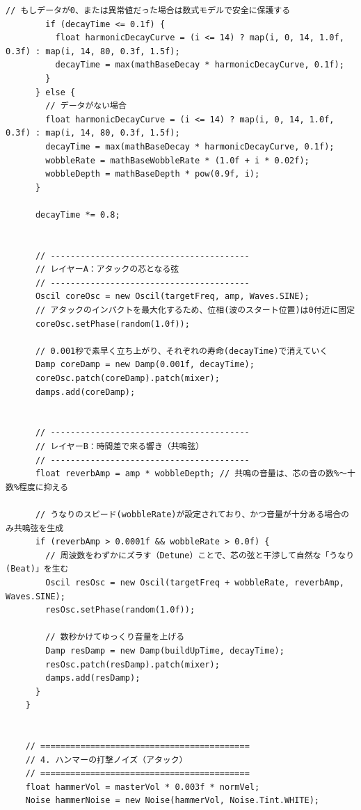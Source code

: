 \begin{lstlisting}[caption={Piano.pde}, label={lst:proc_piano}]
        // もしデータが0、または異常値だった場合は数式モデルで安全に保護する
        if (decayTime <= 0.1f) {
          float harmonicDecayCurve = (i <= 14) ? map(i, 0, 14, 1.0f, 0.3f) : map(i, 14, 80, 0.3f, 1.5f);
          decayTime = max(mathBaseDecay * harmonicDecayCurve, 0.1f);
        }
      } else {
        // データがない場合
        float harmonicDecayCurve = (i <= 14) ? map(i, 0, 14, 1.0f, 0.3f) : map(i, 14, 80, 0.3f, 1.5f);
        decayTime = max(mathBaseDecay * harmonicDecayCurve, 0.1f);
        wobbleRate = mathBaseWobbleRate * (1.0f + i * 0.02f); 
        wobbleDepth = mathBaseDepth * pow(0.9f, i);
      }
      
      decayTime *= 0.8;
      
      
      // ----------------------------------------
      // レイヤーA：アタックの芯となる弦
      // ----------------------------------------
      Oscil coreOsc = new Oscil(targetFreq, amp, Waves.SINE);
      // アタックのインパクトを最大化するため、位相(波のスタート位置)は0付近に固定
      coreOsc.setPhase(random(1.0f)); 
      
      // 0.001秒で素早く立ち上がり、それぞれの寿命(decayTime)で消えていく
      Damp coreDamp = new Damp(0.001f, decayTime);
      coreOsc.patch(coreDamp).patch(mixer);
      damps.add(coreDamp);
      
      
      // ----------------------------------------
      // レイヤーB：時間差で来る響き（共鳴弦）
      // ----------------------------------------
      float reverbAmp = amp * wobbleDepth; // 共鳴の音量は、芯の音の数%〜十数%程度に抑える
      
      // うなりのスピード(wobbleRate)が設定されており、かつ音量が十分ある場合のみ共鳴弦を生成
      if (reverbAmp > 0.0001f && wobbleRate > 0.0f) {
        // 周波数をわずかにズラす（Detune）ことで、芯の弦と干渉して自然な「うなり(Beat)」を生む
        Oscil resOsc = new Oscil(targetFreq + wobbleRate, reverbAmp, Waves.SINE);
        resOsc.setPhase(random(1.0f));
        
        // 数秒かけてゆっくり音量を上げる
        Damp resDamp = new Damp(buildUpTime, decayTime);
        resOsc.patch(resDamp).patch(mixer);
        damps.add(resDamp);
      }
    }
    
    
    // ==========================================
    // 4. ハンマーの打撃ノイズ（アタック）
    // ==========================================
    float hammerVol = masterVol * 0.003f * normVel; 
    Noise hammerNoise = new Noise(hammerVol, Noise.Tint.WHITE);
    

\end{lstlisting}
